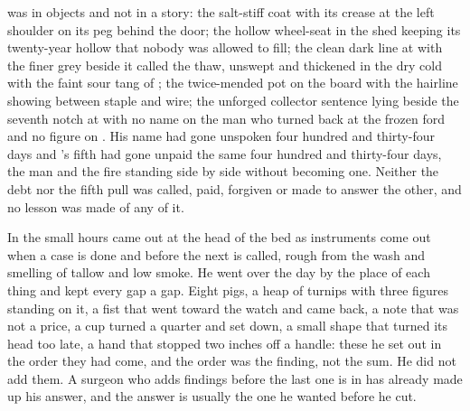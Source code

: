  was in objects and not in a story: the salt-stiff coat with its crease at the left shoulder on its peg behind the door; the hollow wheel-seat in the shed keeping its twenty-year hollow that nobody was allowed to fill; the clean dark line at  with the finer grey beside it called the thaw, unswept and thickened in the dry cold with the faint sour tang of ; the twice-mended pot on the board with the hairline showing between staple and wire; the unforged collector sentence lying beside the seventh notch at  with no name on the man who turned back at the frozen ford and no figure on . His name had gone unspoken four hundred and thirty-four days and 's fifth had gone unpaid the same four hundred and thirty-four days, the man and the fire standing side by side without becoming one. Neither the debt nor the fifth pull was called, paid, forgiven or made to answer the other, and no lesson was made of any of it.

\scenebreak

In the small hours  came out at the head of the bed as instruments come out when a case is done and before the next is called, rough from the wash and smelling of tallow and low smoke. He went over the day by the place of each thing and kept every gap a gap. Eight pigs, a heap of turnips with three figures standing on it, a fist that went toward the watch and came back, a note that was not a price, a cup turned a quarter and set down, a small shape that turned its head too late, a hand that stopped two inches off a handle: these he set out in the order they had come, and the order was the finding, not the sum. He did not add them. A surgeon who adds findings before the last one is in has already made up his answer, and the answer is usually the one he wanted before he cut.

